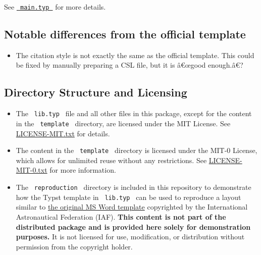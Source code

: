 See
\href{https://github.com/typst/packages/raw/main/packages/preview/stellar-iac/0.4.1/template/main.typ}{\texttt{\ main.typ\ }}
for more details.

\subsection{Notable differences from the official
template}\label{notable-differences-from-the-official-template}

\begin{itemize}
\tightlist
\item
  The citation style is not exactly the same as the official template.
  This could be fixed by manually preparing a CSL file, but it is
  â€œgood enough.â€?
\end{itemize}

\subsection{Directory Structure and
Licensing}\label{directory-structure-and-licensing}

\begin{itemize}
\item
  The \texttt{\ lib.typ\ } file and all other files in this package,
  except for the content in the \texttt{\ template\ } directory, are
  licensed under the MIT License. See
  \href{https://github.com/typst/packages/raw/main/packages/preview/stellar-iac/0.4.1/LICENSE-MIT.txt}{LICENSE-MIT.txt}
  for details.
\item
  The content in the \texttt{\ template\ } directory is licensed under
  the MIT-0 License, which allows for unlimited reuse without any
  restrictions. See
  \href{https://github.com/typst/packages/raw/main/packages/preview/stellar-iac/0.4.1/LICENSE-MIT-0.txt}{LICENSE-MIT-0.txt}
  for more information.
\item
  The \texttt{\ reproduction\ } directory is included in this repository
  to demonstrate how the Typst template in \texttt{\ lib.typ\ } can be
  used to reproduce a layout similar to
  \href{https://www.iafastro.org/assets/files/IAC\%202023_Manuscript-Template.doc}{the
  original MS Word template} copyrighted by the International
  Astronautical Federation (IAF). \textbf{This content is not part of
  the distributed package and is provided here solely for demonstration
  purposes.} It is not licensed for use, modification, or distribution
  without permission from the copyright holder.
\end{itemize}

